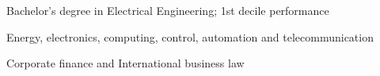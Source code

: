 \documentclass[]{deedy-resume}
\begin{document}
\begin{minipage}[t]{0.66\textwidth}
\begin{tightemize}\item Bachelor's degree in Electrical Engineering; 1st decile performance
\item Energy, electronics, computing, control, automation and telecommunication
\end{tightemize}
\sectionsep

\begin{tightemize}\item Corporate finance and International business law
\end{tightemize}

\end{minipage} 
\end{document}
